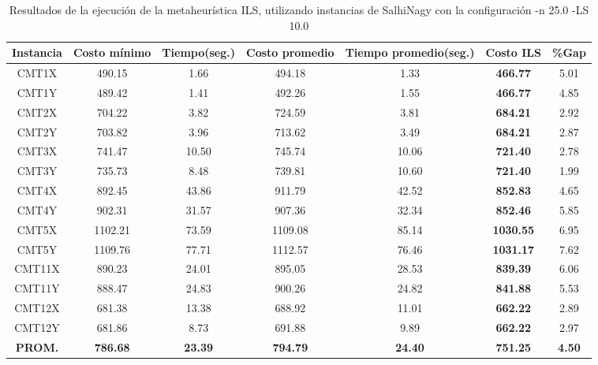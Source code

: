 \begin{table}[ht]
\caption{Resultados de la ejecución de la metaheurística ILS, utilizando instancias de SalhiNagy con la configuración -n 25.0 -LS 10.0}
\centering
\small
\begin{tabular}{c c c c c c c}
\hline\hline
Instancia & Costo mínimo & Tiempo(seg.) & Costo promedio & Tiempo promedio(seg.) & Costo ILS & \%Gap \\ [0.5ex]
\hline
CMT1X & 490.15 & 1.66 & 
494.18 & 1.33 & \bf{466.77} & 
5.01\\CMT1Y & 489.42 & 1.41 & 
492.26 & 1.55 & \bf{466.77} & 
4.85\\CMT2X & 704.22 & 3.82 & 
724.59 & 3.81 & \bf{684.21} & 
2.92\\CMT2Y & 703.82 & 3.96 & 
713.62 & 3.49 & \bf{684.21} & 
2.87\\CMT3X & 741.47 & 10.50 & 
745.74 & 10.06 & \bf{721.40} & 
2.78\\CMT3Y & 735.73 & 8.48 & 
739.81 & 10.60 & \bf{721.40} & 
1.99\\CMT4X & 892.45 & 43.86 & 
911.79 & 42.52 & \bf{852.83} & 
4.65\\CMT4Y & 902.31 & 31.57 & 
907.36 & 32.34 & \bf{852.46} & 
5.85\\CMT5X & 1102.21 & 73.59 & 
1109.08 & 85.14 & \bf{1030.55} & 
6.95\\CMT5Y & 1109.76 & 77.71 & 
1112.57 & 76.46 & \bf{1031.17} & 
7.62\\CMT11X & 890.23 & 24.01 & 
895.05 & 28.53 & \bf{839.39} & 
6.06\\CMT11Y & 888.47 & 24.83 & 
900.26 & 24.82 & \bf{841.88} & 
5.53\\CMT12X & 681.38 & 13.38 & 
688.92 & 11.01 & \bf{662.22} & 
2.89\\CMT12Y & 681.86 & 8.73 & 
691.88 & 9.89 & \bf{662.22} & 
2.97\\\bf{PROM.} & 
\bf{786.68} & \bf{23.39} & \bf{794.79} & \bf{24.40} & \bf{751.25} & \bf{4.50}\\[1ex]\hline
\end{tabular}
\label{table:nonlin}
\end{table} \clearpage
